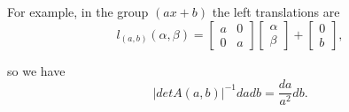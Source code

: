 \documentclass[a4paper,11pt]{article} %
\numberwithin{equation}{section} %
\numberwithin{figure}{section} %
\begin{document}
For example, in the group $(ax+b)$ the left translations are 
\begin{equation}
 l_{(a,b)}(\alpha,\beta)=
 \left[
\begin{array}{ll}
a & 0\\
0 & a
\end{array}
\right]
\left[
\begin{array}{l}
\alpha \\
\beta
\end{array}
\right]
+
\left[
\begin{array}{l}
0 \\
b
\end{array}
\right],
\end{equation}

so we have
\begin{equation}
 |det A(a,b)|^{-1} da db = \frac{da}{a^2} db.
\end{equation}
\end{document}
